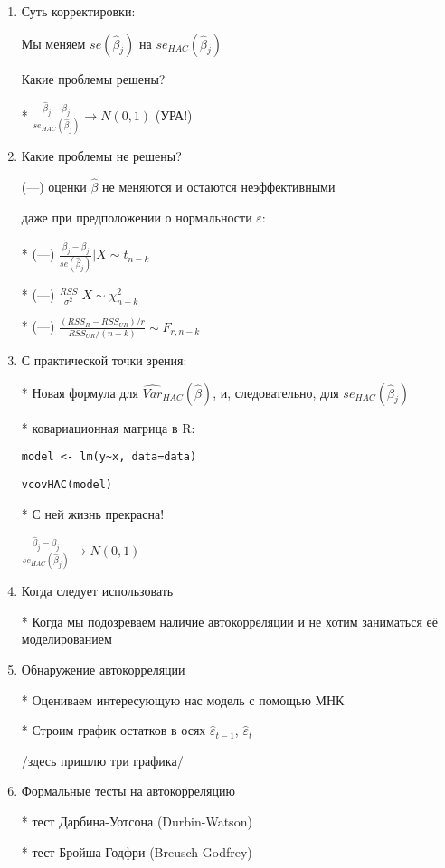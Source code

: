 \documentclass[12pt,a4paper]{article}
\begin{document}
{\begin{enumerate}
\newpage
\item  Суть корректировки:

Мы меняем $se(\hat{\beta}_j)$ на $se_{HAC}(\hat{\beta}_j)$

Какие проблемы решены?

* $\frac{\hat{\beta}_j-\beta_j}{se_{HAC}(\hat{\beta}_j)} \to N(0,1)$ (УРА!)

\item Какие проблемы не решены?

(---) оценки $\hat{\beta}$ не меняются и остаются неэффективными


даже при предположении о нормальности $\varepsilon$:

* (---) $\frac{\hat{\beta}_j-\beta_j}{se(\hat{\beta}_j)} | X \sim t_{n-k}$

* (---) $\frac{RSS}{\sigma^2} |X \sim \chi^2_{n-k}$

* (---) $\frac{(RSS_R-RSS_{UR})/r}{RSS_{UR}/(n-k)} \sim F_{r,n-k}$

\newpage
\item С практической точки зрения:

* Новая формула для $\widehat{Var}_{HAC}(\hat{\beta})$, и, следовательно, для  $se_{HAC}(\hat{\beta}_j)$

* ковариационная матрица в R:

\verb|model <- lm(y~x, data=data)|

\verb|vcovHAC(model)|

* С ней жизнь прекрасна!

$\frac{\hat{\beta}_j-\beta_j}{se_{HAC}(\hat{\beta}_j)} \to N(0,1)$

\item Когда следует использовать 

* Когда мы подозреваем наличие автокорреляции и не хотим заниматься её моделированием

\newpage

\item Обнаружение автокорреляции

* Оцениваем интересующую нас модель с помощью МНК

* Строим график остатков в осях $\hat{\varepsilon}_{t-1}$, $\hat{\varepsilon}_{t}$

/здесь пришлю три графика/

\item Формальные тесты на автокорреляцию

* тест Дарбина-Уотсона (Durbin-Watson)

* тест Бройша-Годфри (Breusch-Godfrey)



\end{enumerate}}
\end{document}
